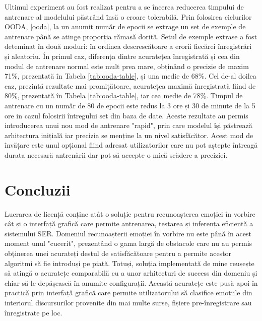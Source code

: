 \documentclass[a4paper,12pt]{book}
\begin{document}
		 Ultimul experiment au fost realizat pentru a se încerca reducerea timpului de antrenare al modelului păstrând însă o eroare tolerabilă. Prin folosirea ciclurilor OODA, \ref{ooda}, la un anumit număr de epocii se extrage un set de exemple de antrenare până se atinge proporția rămasă dorită. Setul de exemple extrase a fost deteminat în două moduri: în ordinea descrescătoare a erorii fiecărei înregistrări și aleatoriu. În primul caz, diferența dintre acuratețea înregistrată și cea din modul de antrenare normal este mult prea mare, obținând o precizie de maxim 71\%, prezentată în Tabela \ref{tab:ooda-table}, și una medie de 68\%. Cel de-al doilea caz, prezintă rezultate mai promițătoare, acuratețea maximă înregistrată fiind de 80\%, prezentată în Tabela \ref{tab:ooda-table}, iar cea medie de 78\%. Timpul de antrenare cu un număr de 80 de epocii este redus la 3 ore și 30 de minute de la 5 ore in cazul folosirii întregului set din baza de date. Aceste rezultate au permis introducerea unui nou mod de antrenare "rapid", prin care modelul își păstrează arhitectura inițială iar precizia se menține la un nivel satisfăcător. Acest mod de învățare este unul opțional fiind adresat utilizatorilor care nu pot aștepte întreagă durata necesară antrenării dar pot să accepte o mică scădere a preciziei. \par
		\chapter{Concluzii}		
		Lucrarea de licență conține atât o soluție pentru recunoașterea emoției în vorbire cât și o interfață grafică care permite antrenarea, testarea și inferența eficientă a sistemului SER. Domeniul recunoașterii emoției în vorbire nu este până în acest moment unul "cucerit", prezentând o gama largă de obstacole care nu au permis obținerea unei acurateți destul de satisfăcătoare pentru a permite acestor algoritmi să fie introduși pe piață. Totuși, soluția implementată de mine reușește să atingă o acuratețe comparabilă cu a unor arhitecturi de success din domeniu și chiar să le depășească în anumite configurații. Această acuratețe este pusă apoi în practică prin interfață grafică care permite utilizatorului să clasifice emoțiile din interiorul discursurilor provenite din mai multe surse, fișiere pre-înregistrare sau înregistrate pe loc. \par		
		
\end{document}
